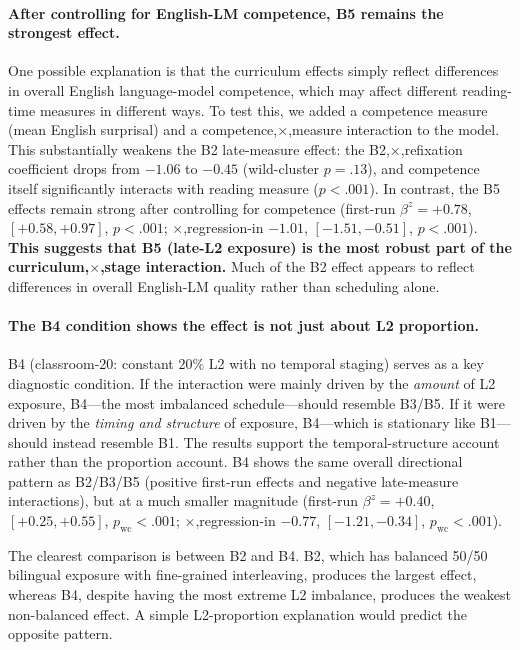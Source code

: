 \documentclass[11pt]{article}
\begin{document}
\paragraph{After controlling for English-LM competence, B5 remains the strongest effect.} One possible explanation is that the curriculum effects simply reflect differences in overall English language-model competence, which may affect different reading-time measures in different ways. To test this, we added a competence measure (mean English surprisal) and a competence,$\times$,measure interaction to the model. This substantially weakens the B2 late-measure effect: the B2,$\times$,refixation coefficient drops from $-1.06$ to $-0.45$ (wild-cluster $p{=} .13$), and competence itself significantly interacts with reading measure ($p{<}.001$). In contrast, the B5 effects remain strong after controlling for competence (first-run $\beta^{z}{=}{+}0.78$, $[+0.58, +0.97]$, $p{<}.001$; $\times$,regression-in $-1.01$, $[-1.51, -0.51]$, $p{<}.001$). \textbf{This suggests that B5 (late-L2 exposure) is the most robust part of the curriculum,$\times$,stage interaction.} Much of the B2 effect appears to reflect differences in overall English-LM quality rather than scheduling alone.

\paragraph{The B4 condition shows the effect is not just about L2 proportion.}
B4 (classroom-20: constant $20 \%$ L2 with no temporal staging) serves as a key diagnostic condition. If the interaction were mainly driven by the \emph{amount} of L2 exposure, B4---the most imbalanced schedule---should resemble B3/B5. If it were driven by the \emph{timing and structure} of exposure, B4---which is stationary like B1---should instead resemble B1. The results support the temporal-structure account rather than the proportion account. B4 shows the same overall directional pattern as B2/B3/B5 (positive first-run effects and negative late-measure interactions), but at a much smaller magnitude (first-run $\beta^{z}{=}{+}0.40$, $[+0.25, +0.55]$, $p_{\mathrm{wc}}{<}.001$; $\times$,regression-in $-0.77$, $[-1.21, -0.34]$, $p_{\mathrm{wc}}{<}.001$).

The clearest comparison is between B2 and B4. B2, which has balanced 50/50 bilingual exposure with fine-grained interleaving, produces the largest effect, whereas B4, despite having the most extreme L2 imbalance, produces the weakest non-balanced effect. A simple L2-proportion explanation would predict the opposite pattern.
\end{document}
